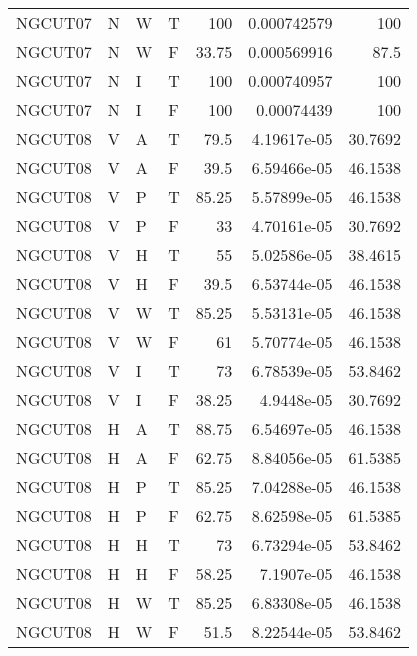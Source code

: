 \begin{longtable}{llllrrr}
    NGCUT07  & N     & W     & T          & 100        & 0.000742579 & 100      \\
    NGCUT07  & N     & W     & F          & 33.75      & 0.000569916 & 87.5     \\
    NGCUT07  & N     & I     & T          & 100        & 0.000740957 & 100      \\
    NGCUT07  & N     & I     & F          & 100        & 0.00074439  & 100      \\
    NGCUT08  & V     & A     & T          & 79.5       & 4.19617e-05 & 30.7692  \\
    NGCUT08  & V     & A     & F          & 39.5       & 6.59466e-05 & 46.1538  \\
    NGCUT08  & V     & P     & T          & 85.25      & 5.57899e-05 & 46.1538  \\
    NGCUT08  & V     & P     & F          & 33         & 4.70161e-05 & 30.7692  \\
    NGCUT08  & V     & H     & T          & 55         & 5.02586e-05 & 38.4615  \\
    NGCUT08  & V     & H     & F          & 39.5       & 6.53744e-05 & 46.1538  \\
    NGCUT08  & V     & W     & T          & 85.25      & 5.53131e-05 & 46.1538  \\
    NGCUT08  & V     & W     & F          & 61         & 5.70774e-05 & 46.1538  \\
    NGCUT08  & V     & I     & T          & 73         & 6.78539e-05 & 53.8462  \\
    NGCUT08  & V     & I     & F          & 38.25      & 4.9448e-05  & 30.7692  \\
    NGCUT08  & H     & A     & T          & 88.75      & 6.54697e-05 & 46.1538  \\
    NGCUT08  & H     & A     & F          & 62.75      & 8.84056e-05 & 61.5385  \\
    NGCUT08  & H     & P     & T          & 85.25      & 7.04288e-05 & 46.1538  \\
    NGCUT08  & H     & P     & F          & 62.75      & 8.62598e-05 & 61.5385  \\
    NGCUT08  & H     & H     & T          & 73         & 6.73294e-05 & 53.8462  \\
    NGCUT08  & H     & H     & F          & 58.25      & 7.1907e-05  & 46.1538  \\
    NGCUT08  & H     & W     & T          & 85.25      & 6.83308e-05 & 46.1538  \\
    NGCUT08  & H     & W     & F          & 51.5       & 8.22544e-05 & 53.8462  \\

\end{longtable}
